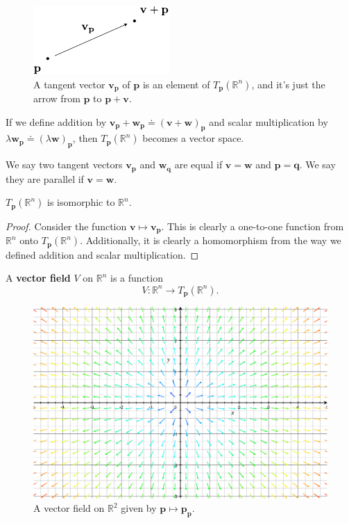 \documentclass[10pt]{report}
\begin{document}
\begin{figure}[H]
	\centering
	\includegraphics[scale=1]{fig/tan-vec.pdf}
	\caption{A tangent vector $\mathbf{v}_{\mathbf{p}}$ of $\mathbf{p}$ is an element of $T_{\mathbf{p}}(\mathbb{R}^n)$, and it's just the arrow from $\mathbf{p}$ to $\mathbf{p}+\mathbf{v}$.}
\end{figure}

If we define addition by $\mathbf{v}_{\mathbf{p}}+\mathbf{w}_{\mathbf{p}} \doteq (\mathbf{v}+\mathbf{w})_\mathbf{p}$ and scalar multiplication by $\lambda \mathbf{w}_\mathbf{p} \doteq (\lambda \mathbf{w})_\mathbf{p}$, then $T_\mathbf{p}(\mathbb{R}^n)$ becomes a vector space.

We say two tangent vectors $\mathbf{v}_\mathbf{p}$ and $\mathbf{w}_{\mathbf{q}}$ are equal if $\mathbf{v}=\mathbf{w}$ and $\mathbf{p}=\mathbf{q}$. We say they are parallel if $\mathbf{v}=\mathbf{w}$.

\begin{prop}
	$T_\mathbf{p}(\mathbb{R}^n)$ is isomorphic to $\mathbb{R}^n$.
\end{prop}
\begin{proof}
	Consider the function $\mathbf{v} \mapsto \mathbf{v}_\mathbf{p}$. This is clearly a one-to-one function from $\mathbb{R}^n$ onto $T_\mathbf{p}(\mathbb{R}^n)$. Additionally, it is clearly a homomorphism from the way we defined addition and scalar multiplication.
\end{proof}

\begin{defn}
	A \textbf{vector field} $V$ on $\mathbb{R}^n$ is a function
	\[
		V:\mathbb{R}^n \to T_{\mathbf{p}}(\mathbb{R}^n).
	\] 
\end{defn}

\begin{figure}[H]
	\centering
	\includegraphics[scale=0.3]{fig/vec-field.pdf}
	\caption{A vector field on $\mathbb{R}^2$ given by $\mathbf{p}\mapsto \mathbf{p}_{\mathbf{p}}.$}
\end{figure}
\end{document}
